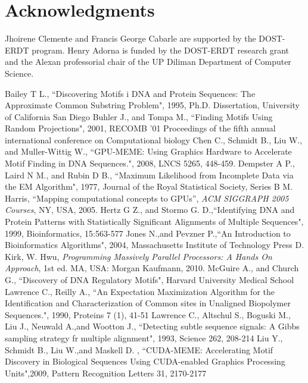 \documentclass{llncs}
\begin{document}
{\section*{Acknowledgments}
Jhoirene Clemente and Francis George Cabarle are supported by the {DOST-ERDT program}. Henry Adorna is funded by the {DOST-ERDT research grant} and the Alexan professorial chair of the {UP Diliman Department of Computer Science}.




\begin{thebibliography}{99}
 Bailey T L., ``Discovering Motifs i DNA and Protein Sequences: The Approximate Common Substring Problem", 1995, Ph.D. Dissertation, University of California San Diego
Buhler J., and Tompa M., ``Finding Motifs Using Random Projections", 2001, RECOMB '01 Proceedings of the fifth annual international conference on Computational biology
Chen C., Schmidt B., Liu W., and Muller-Wittig W., ``GPU-MEME: Using Graphics
Hardware to Accelerate Motif Finding in DNA Sequences.", 2008, LNCS 5265, 448-459.
 Dempster A P., Laird N M., and Rubin D B., ``Maximum Likelihood from Incomplete Data via the EM Algorithm", 1977, Journal of the Royal Statistical Society, Series B
 M. Harris, ``Mapping computational concepts to GPUs'', {\it ACM SIGGRAPH 2005 Courses}, NY, USA, 2005.
 Hertz G Z., and Stormo G. D.,``Identifying DNA and Protein Patterns with Statistically Significant Alignments of Multiple Sequences", 1999, Bioinformatics, 15:563-577
 Jones N.,and Pevzner P.,``An Introduction to Bioinformatics Algorithms", 2004, Massachusetts Institute of Technology Press 
 D. Kirk, W. Hwu, {\it Programming Massively Parallel Processors: A Hands On Approach}, 1st ed. MA, USA: Morgan Kaufmann, 2010.
 McGuire A., and Church G., ``Discovery of DNA Regulatory Motifs", Harvard University Medical School
 Lawrence C., Reilly A., ``An Expectation Maximization Algorithm for the Identification and Characterization of Common sites in Unaligned Biopolymer Sequences.", 1990, Proteins 7 (1), 41-51
 Lawrence C., Altschul S., Boguski M., Liu J., Neuwald A.,and Wootton J., ``Detecting subtle sequence signals: A Gibbs sampling strategy fr multiple alignment", 1993, Science 262, 208-214 
 Liu Y., Schmidt B., Liu W.,and Maskell D. , ``CUDA-MEME: Accelerating Motif Discovery in Biological Sequences Using CUDA-enabled Graphics Processing Units",2009, Pattern Recognition Letters 31, 2170-2177

\end{thebibliography}}
\end{document}
